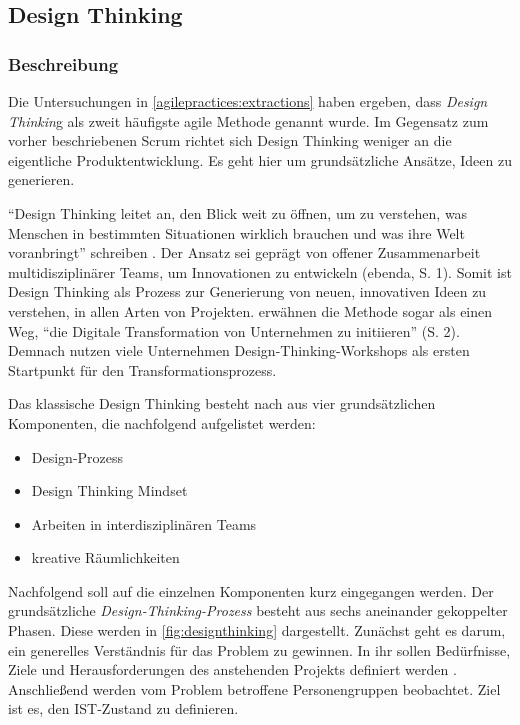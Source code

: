 \subsection{Design Thinking}

\subsubsection{Beschreibung}

Die Untersuchungen in \ref{agilepractices:extractions} haben ergeben, dass \textit{Design Thinkin}g als zweit häufigste agile Methode genannt wurde. Im Gegensatz zum vorher beschriebenen Scrum richtet sich Design Thinking weniger an die eigentliche Produktentwicklung. Es geht hier um grundsätzliche Ansätze, Ideen zu generieren.

``Design Thinking leitet an, den Blick weit zu öffnen, um zu verstehen, was Menschen in bestimmten Situationen wirklich brauchen und was ihre Welt voranbringt''  schreiben . Der Ansatz sei geprägt von offener Zusammenarbeit multidisziplinärer Teams, um Innovationen zu entwickeln (ebenda, S. 1).  Somit ist Design Thinking als Prozess zur Generierung von neuen, innovativen Ideen zu verstehen, in allen Arten von Projekten.  erwähnen die Methode sogar als einen Weg, ``die Digitale Transformation von Unternehmen zu initiieren'' (S. 2). Demnach nutzen viele Unternehmen Design-Thinking-Workshops als ersten Startpunkt für den Transformationsprozess.

Das klassische Design Thinking besteht nach  aus vier grundsätzlichen Komponenten, die nachfolgend aufgelistet werden:

\begin{itemize}[noitemsep, topsep=0pt]
	\item Design-Prozess
	\item Design Thinking Mindset
	\item Arbeiten in interdisziplinären Teams
	\item kreative Räumlichkeiten
\end{itemize}

Nachfolgend soll auf die einzelnen Komponenten kurz eingegangen werden. Der grundsätzliche \textit{Design-Thinking-Prozess} besteht aus sechs aneinander gekoppelter Phasen. Diese werden in \ref{fig:designthinking} dargestellt. Zunächst geht es darum, ein generelles Verständnis für das Problem zu gewinnen. In ihr sollen Bedürfnisse, Ziele und Herausforderungen des anstehenden Projekts definiert werden \cite[S. 2]{lewrick_design_2018}. Anschließend werden vom Problem betroffene Personengruppen beobachtet. Ziel ist es, den IST-Zustand zu definieren.

